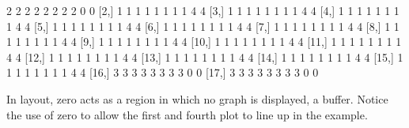 \documentclass[]{article}
\begin{document}
\begin{Schunk}
\begin{Soutput}
      [,1] [,2] [,3] [,4] [,5] [,6] [,7] [,8] [,9] [,10]
 [1,]    2    2    2    2    2    2    2    2    0     0
 [2,]    1    1    1    1    1    1    1    1    4     4
 [3,]    1    1    1    1    1    1    1    1    4     4
 [4,]    1    1    1    1    1    1    1    1    4     4
 [5,]    1    1    1    1    1    1    1    1    4     4
 [6,]    1    1    1    1    1    1    1    1    4     4
 [7,]    1    1    1    1    1    1    1    1    4     4
 [8,]    1    1    1    1    1    1    1    1    4     4
 [9,]    1    1    1    1    1    1    1    1    4     4
[10,]    1    1    1    1    1    1    1    1    4     4
[11,]    1    1    1    1    1    1    1    1    4     4
[12,]    1    1    1    1    1    1    1    1    4     4
[13,]    1    1    1    1    1    1    1    1    4     4
[14,]    1    1    1    1    1    1    1    1    4     4
[15,]    1    1    1    1    1    1    1    1    4     4
[16,]    3    3    3    3    3    3    3    3    0     0
[17,]    3    3    3    3    3    3    3    3    0     0
\end{Soutput}
\end{Schunk}

 In layout, zero acts as a region in which no graph is displayed, a buffer. Notice the use of zero to allow the first and fourth plot to line up in the example.
\end{document}
